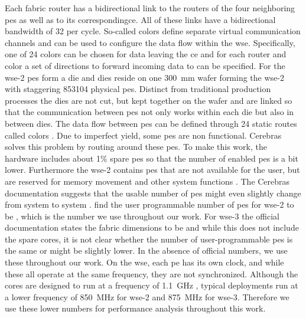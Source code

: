 Each fabric router has a bidirectional link to the routers of the four neighboring \acp{pe} as well as to its corresponding\ac{ce}. All of these links have a bidirectional bandwidth of \qty{32}{\bit} per cycle. So-called colors define separate virtual communication channels and can be used to configure the data flow within the \ac{wse}. Specifically, one of 24 colors can be chosen for data leaving the \ac{ce} and for each router and color a set of directions to forward incoming data to can be specified. For the \ac{wse}-2  \acp{pe} form a die and  dies reside on one \qty{300}{\mm} wafer forming the \ac{wse}-2 with staggering \num{853104} physical \acp{pe}. Distinct from traditional production processes the dies are not cut, but kept together on the wafer and are linked so that the communication between \acp{pe} not only works within each die but also in between dies.
The data flow between \acp{pe} can be defined through 24 static routes called colors \cite{lie2023cerebras}.
Due to imperfect yield, some \acp{pe} are non functional.
Cerebras solves this problem by routing around these \acp{pe}. 
To make this work, the hardware includes about 1\% spare \acp{pe} so that the number of enabled \acp{pe} is a bit lower. Furthermore the \ac{wse}-2 contains \acp{pe} that are not available for the user, but are reserved for memory movement and other system functions \cite{tramm2024efficient}.
The Cerebras documentation suggests that the usable number of \acp{pe} might even slightly change from system to system \cite{cerebras_gemv_tutorial}. \citeauthor{tramm2024efficient} \cite{tramm2024efficient} find the user programmable number of \acp{pe} for \ac{wse}-2 to be , which is the number we use throughout our work. For \ac{wse}-3 the official documentation states the fabric dimensions to be  and while this does not include the spare cores, it is not clear whether the number of user-programmable \acp{pe} is the same or might be slightly lower. In the absence of official numbers, we use these throughout our work. On the \ac{wse}, each \ac{pe} has its own clock, and while these all operate at the same frequency, they are not synchronized. Although the cores are designed to run at a frequency of \qty{1.1}{\giga\hertz} \cite{lie2023cerebras}, typical deployments run at a lower frequency of \qty{850}{\mega\hertz} for \ac{wse}-2 \cite{tramm2024efficient} and \qty{875}{\mega\hertz} for \ac{wse}-3. Therefore we use these lower numbers for performance analysis throughout this work.

